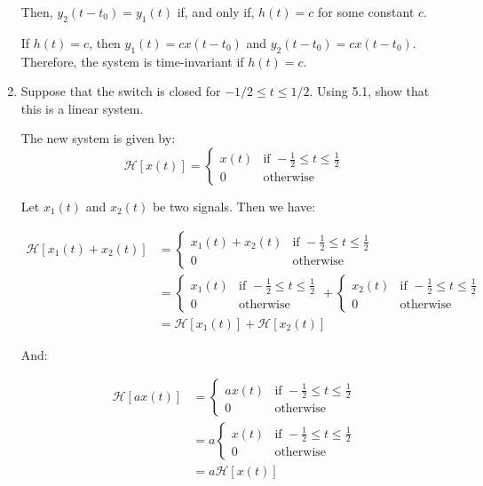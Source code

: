 \documentclass{article}
\begin{document}
\begin{enumerate}[label=5.\arabic*]
    Then, $y_2(t-t_0) = y_1(t)$ if, and only if, $h(t) = c$ for some constant $c$.

    If $h(t) = c$, then $y_1(t) = cx(t-t_0)$ and $y_2(t-t_0) = cx(t-t_0)$. Therefore, the system is time-invariant if $h(t) = c$.

    \item Suppose that the switch is closed for $-1/2 \leq t \leq 1/2$. Using 5.1, show that this is a linear system.

    The new system is given by:
    \[
       \mathcal{H}[x(t)] =\begin{cases}
        x(t) & \text{if } -\frac{1}{2} \leq t \leq \frac{1}{2} \\
        0 & \text{otherwise}
        \end{cases}
    \]

    Let $x_1(t)$ and $x_2(t)$ be two signals. Then we have:

    \begin{align*}
        \mathcal{H}[x_1(t) + x_2(t)] &= \begin{cases}
            x_1(t) + x_2(t) & \text{if } -\frac{1}{2} \leq t \leq \frac{1}{2} \\
            0 & \text{otherwise}
        \end{cases} \\
        &= \begin{cases}
            x_1(t) & \text{if } -\frac{1}{2} \leq t \leq \frac{1}{2} \\
            0 & \text{otherwise}
        \end{cases} + \begin{cases}
            x_2(t) & \text{if } -\frac{1}{2} \leq t \leq \frac{1}{2} \\
            0 & \text{otherwise}
        \end{cases} \\
        &= \mathcal{H}[x_1(t)] + \mathcal{H}[x_2(t)]
    \end{align*}

    And:

    \begin{align*}
        \mathcal{H}[ax(t)] &= \begin{cases}
            ax(t) & \text{if } -\frac{1}{2} \leq t \leq \frac{1}{2} \\
            0 & \text{otherwise}
        \end{cases} \\
        &= a\begin{cases}
            x(t) & \text{if } -\frac{1}{2} \leq t \leq \frac{1}{2} \\
            0 & \text{otherwise}
        \end{cases} \\
        &= a\mathcal{H}[x(t)]
    \end{align*}


\end{enumerate}
\end{document}
